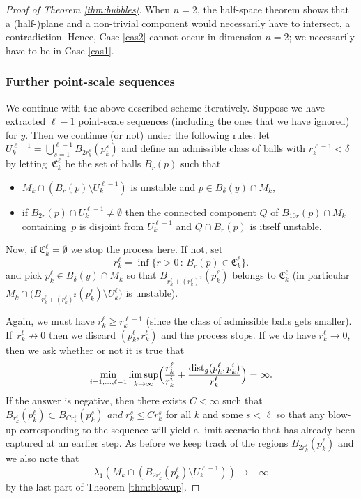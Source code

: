 \documentclass[JEP,XML,SOM,Unicode]{cedram}
\newcounter{cas}
\newcommand{\sep}{\,:\,}
\DeclareMathOperator{\dist}{dist}
\theoremstyle{definition}
\begin{document}
\begin{proof}[Proof of Theorem \ref{thm:bubbles}]
When $n=2$, the half-space theorem shows that a (half-)plane and a non-trivial component would necessarily have to intersect, a contradiction. Hence, Case \ref{cas2} cannot occur in dimension $n=2$; we necessarily have to be in Case \ref{cas1}.
\addtocounter{cas}{-2}

\subsubsection*{Further point-scale sequences}
We continue with the above described scheme iteratively. Suppose we have extracted $\ell-1$ point-scale sequences (including the ones that we have ignored) for $y$. Then we continue (or not) under the following rules: let $U^{\ell-1}_k = \bigcup_{s=1}^{\ell-1} B_{2r^s_k }(p_k^s)$ and define an admissible class of balls with $r^{\ell -1}_k<\delta$ by letting~$\mathfrak{C}^\ell_k$ be the set of balls $B_r(p)$ such that 
\begin{itemize}
\item
$M_k\cap (B_r(p)\setminus U^{\ell -1}_k)$ is unstable and $p\in B_\delta (y)\cap M_k$,
\item
if $B_{2r}(p)\cap U^{\ell-1}_k\neq\emptyset$ then the connected component $Q$ of $B_{10r}(p)\cap M_k$ containing~$p$ is disjoint from $U^{\ell-1}_k$ and $Q\cap B_{r}(p)$ is itself unstable.
\end{itemize}
Now, if $\mathfrak{C}^\ell_k =\emptyset$ we stop the process here. If not, set
\begin{equation*}
r^\ell_k = \inf \bigl\{r>0 \sep B_r(p)\in \mathfrak{C}^{\ell}_k\bigr\}.
\end{equation*}
and pick $p^{\ell}_k\in B_\delta(y)\cap M_k$ so that $B_{r^\ell_k +(r^{\ell}_k)^2}(p^\ell_k)$ belongs to $\mathfrak{C}^\ell_k$ (in particular \hbox{$M_k \cap\big( B_{r^\ell_k +(r^{\ell}_k)^2}(p^\ell_k)\setminus U^\ell_k\big)$} is unstable).

Again, we must have $r^\ell_k\geq r^{\ell-1}_k$ (since the class of admissible balls gets smaller). If~$r^\ell_k \not\to 0$ then we discard $(p_k^\ell, r_k^\ell)$ and the process stops. If we do have $r_k^\ell \to 0$, then we ask whether or not it is true that
\begin{equation}\label{eq.psinf2}
\min_{i=1,\dots, \ell-1}\limsup_{k\to \infty} \Bigl(\frac{r^\ell_k}{r^{i}_k} + \frac{\dist_g(p_k^\ell,p_k^i)}{r^\ell_k} \Bigr) = \infty.
\end{equation}
If the answer is negative, then there exists $C<\infty$ such that $B_{r^\ell_k}(p^\ell_k)\subset B_{Cr^s_k}(p^s_k)$ \emph{and} $r^s_k\leq C r^s_k$ for all $k$ and some $s<\ell$ so that any blow-up corresponding to the sequence will yield a limit scenario that has already been captured at an earlier step. As before we keep track of the regions $B_{2r^\ell_k}(p^\ell_k)$ and we also note that
$$\lambda_1(M_k \cap (B_{2r^\ell_k}(p^\ell_k)\setminus U^{\ell-1}_k))\to -\infty$$ by the last part of Theorem \ref{thm:blowup}.


\end{proof}
\end{document}
